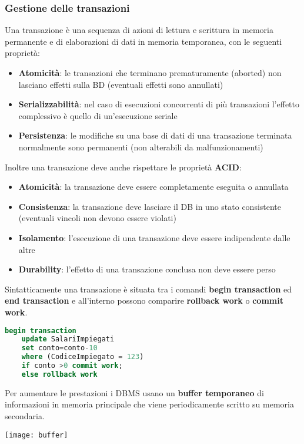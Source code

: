 \subsubsection{Gestione delle transazioni}
\begin{definition}[Transazione]
	Una transazione è una sequenza di azioni di lettura e scrittura in memoria permanente e di elaborazioni di dati in memoria temporanea, con le seguenti proprietà:
	\begin{itemize}
		\item \textbf{Atomicità}: le transazioni che terminano prematuramente (aborted) non lasciano effetti sulla BD (eventuali effetti sono annullati)
		\item \textbf{Serializzabilità}: nel caso di esecuzioni concorrenti di più transazioni l'effetto complessivo è quello di un'esecuzione seriale
		\item \textbf{Persistenza}: le modifiche su una base di dati di una transazione terminata normalmente sono permanenti (non alterabili da malfunzionamenti)
	\end{itemize}
\end{definition}
\noindent Inoltre una transazione deve anche rispettare le proprietà \textbf{ACID}:
\begin{itemize}
	\item \textbf{Atomicità}: la transazione deve essere completamente eseguita o annullata
	\item \textbf{Consistenza}: la transazione deve lasciare il DB in uno stato consistente (eventuali vincoli non devono essere violati)
	\item \textbf{Isolamento}: l'esecuzione di una transazione deve essere indipendente dalle altre
	\item \textbf{Durability}: l'effetto di una transazione conclusa non deve essere perso
\end{itemize}
Sintatticamente una transazione è situata tra i comandi \textbf{begin transaction} ed \textbf{end transaction} e all'interno possono comparire \textbf{rollback work} o \textbf{commit work}.
\begin{lstlisting}[language=SQL]
	begin transaction
	update SalariImpiegati
	set conto=conto-10
	where (CodiceImpiegato = 123)
	if conto >0 commit work;
	else rollback work
\end{lstlisting}

Per aumentare le prestazioni i DBMS usano un \textbf{buffer temporaneo} di informazioni in memoria principale che viene periodicamente scritto su memoria secondaria.
\begin{center}
	\texttt{[image: buffer]}
\end{center}

